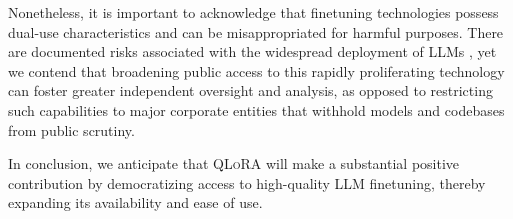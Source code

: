 Nonetheless, it is important to acknowledge that finetuning technologies possess dual-use characteristics and can be misappropriated for harmful purposes. There are documented risks associated with the widespread deployment of LLMs \citep{bommasani2021opportunities,bender2021dangers}, yet we contend that broadening public access to this rapidly proliferating technology can foster greater independent oversight and analysis, as opposed to restricting such capabilities to major corporate entities that withhold models and codebases from public scrutiny.

In conclusion, we anticipate that \textsc{QLoRA} will make a substantial positive contribution by democratizing access to high-quality LLM finetuning, thereby expanding its availability and ease of use.